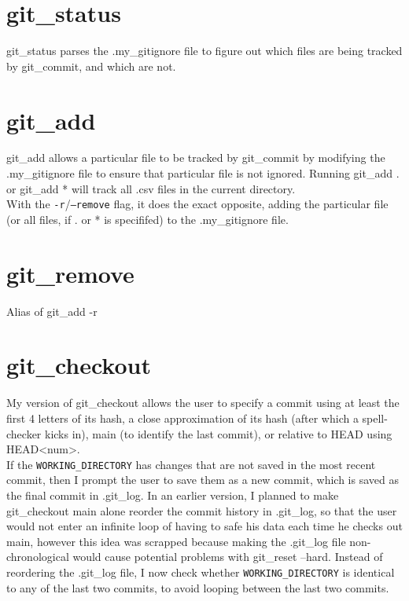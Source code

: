 \documentclass{article}
\begin{document}
    \section{git\_status}
    git\_status parses the .my\_gitignore file to figure out which files are being tracked by git\_commit, and which are not.\\

    \section{git\_add}
    git\_add allows a particular file to be tracked by git\_commit by modifying the .my\_gitignore file to ensure that particular file is not ignored. Running git\_add . or git\_add * will track all .csv files in the current directory.\\
    With the \texttt{-r}/\texttt{--remove} flag, it does the exact opposite, adding the particular file (or all files, if . or * is specififed) to the .my\_gitignore file.

    \section{git\_remove}
    Alias of git\_add -r

    \section{git\_checkout}
    My version of git\_checkout allows the user to specify a commit using at least the first 4 letters of its hash, a close approximation of its hash (after which a spell-checker kicks in), main (to identify the last commit), or relative to HEAD using HEAD\raisebox{0.5ex}{\texttildelow}\textless num\textgreater.\\
    If the \texttt{WORKING\_DIRECTORY} has changes that are not saved in the most recent commit, then I prompt the user to save them as a new commit, which is saved as the final commit in .git\_log.
    In an earlier version, I planned to make git\_checkout main alone reorder the commit history in .git\_log, so that the user would not enter an infinite loop of having to safe his data each time he checks out main, however this idea was scrapped because making the .git\_log file non-chronological would cause potential problems with git\_reset --hard. Instead of reordering the .git\_log file, I now check whether \texttt{WORKING\_DIRECTORY} is identical to any of the last two commits, to avoid looping between the last two commits.
\end{document}
